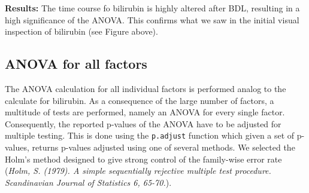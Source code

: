 \documentclass[]{article}
\begin{document}
\textbf{Results:} The time course fo bilirubin is highly altered after
BDL, resulting in a high significance of the ANOVA. This confirms what
we saw in the initial visual inspection of bilirubin (see Figure above).

\subsection{ANOVA for all factors}\label{anova-for-all-factors}

The ANOVA calculation for all individual factors is performed analog to
the calculate for bilirubin. As a consequence of the large number of
factors, a multitude of tests are performed, namely an ANOVA for every
single factor. Consequently, the reported p-values of the ANOVA have to
be adjusted for multiple testing. This is done using the
\texttt{p.adjust} function which given a set of p-values, returns
p-values adjusted using one of several methods. We selected the Holm's
method designed to give strong control of the family-wise error rate
(\emph{Holm, S. (1979). A simple sequentially rejective multiple test
procedure. Scandinavian Journal of Statistics 6, 65-70.}).
\end{document}
